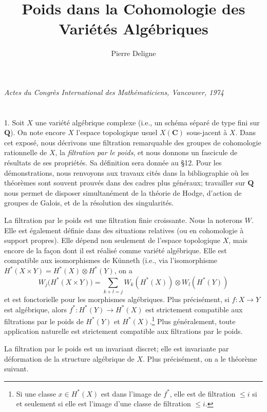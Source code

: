 \documentclass{amsart}
\title{Poids dans la Cohomologie des Vari\'et\'es Alg\'ebriques}
\author{Pierre Deligne}
\theoremstyle{plain}
\theoremstyle{definition}
\theoremstyle{remark}
\begin{document}
\maketitle

\begin{center}
\textit{Actes du Congr\`es International des Math\'ematiciens, Vancouver, 1974}
\end{center}

\section*{}

1. Soit $X$ une vari\'et\'e alg\'ebrique complexe (i.e., un sch\'ema s\'epar\'e de type fini sur $\mathbf{Q}$). On note encore $X$ l'espace topologique usuel $X(\mathbf{C})$ sous-jacent \`a $X$. Dans cet expos\'e, nous d\'ecrivons une filtration remarquable des groupes de cohomologie rationnelle de $X$, la \textit{filtration par le poids}, et nous donnons un fascicule de r\'esultats de ses propri\'et\'es. Sa d\'efinition sera donn\'ee au \S 12. Pour les d\'emonstrations, nous renvoyons aux travaux cit\'es dans la bibliographie o\`u les th\'eor\`emes sont souvent prouv\'es dans des cadres plus g\'en\'eraux; travailler sur $\mathbf{Q}$ nous permet de disposer simultan\'ement de la th\'eorie de Hodge, d'action de groupes de Galois, et de la r\'esolution des singularit\'es.

La filtration par le poids est une filtration finie croissante. Nous la noterons $W$. Elle est \'egalement d\'efinie dans des situations relatives (ou en cohomologie \`a support propres). Elle d\'epend non seulement de l'espace topologique $X$, mais encore de la fa\c{c}on dont il est r\'ealis\'e comme vari\'et\'e alg\'ebrique. Elle est compatible aux isomorphismes de K\"unneth (i.e., via l'isomorphisme $H^*(X \times Y) = H^*(X) \otimes H^*(Y)$, on a
\[
W_j\bigl(H^*(X \times Y)\bigr) = \sum_{k+l=j} W_k(H^*(X)) \otimes W_l(H^*(Y))
\]
et est fonctorielle pour les morphismes alg\'ebriques. Plus pr\'ecis\'ement, si $f: X \to Y$ est alg\'ebrique, alors $f^*: H^*(Y) \to H^*(X)$ est strictement compatible aux filtrations par le poids de $H^*(Y)$ et $H^*(X)$.\footnote{Si une classe $x \in H^*(X)$ est dans l'image de $f^*$, elle est de filtration $\leq i$ si et seulement si elle est l'image d'une classe de filtration $\leq i$.} Plus g\'en\'eralement, toute application naturelle est strictement compatible aux filtrations par le poids.

La filtration par le poids est un invariant discret; elle est invariante par d\'eformation de la structure alg\'ebrique de $X$. Plus pr\'ecis\'ement, on a le th\'eor\`eme suivant.
\end{document}
